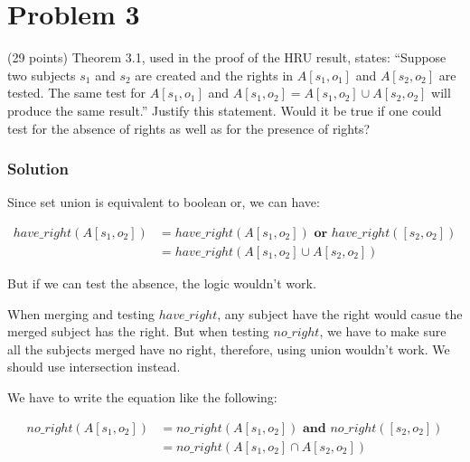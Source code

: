 \section*{Problem 3}

 (29 points) Theorem 3.1, used in the proof of the HRU result, states:
``Suppose two subjects $s_1$ and $s_2$ are created and the rights in $A[s_1, o_1]$ and $A[s_2, o_2]$ are tested.
The same test for $A[s_1, o_1]$ and $A[s_1, o_2] = A[s_1, o_2] \cup A[s_2, o_2]$ will produce the same result.''
Justify this statement.
Would it be true if one could test for the absence of rights as well as for the presence of rights?

\subsubsection*{Solution}

Since set union is equivalent to boolean or, we can have:

\begin{align*}
    have\_right(A[s_1, o_2]) & = have\_right(A[s_1, o_2]) \textbf{ or } have\_right([s_2, o_2]) \\
                             & = have\_right(A[s_1, o_2] \cup A[s_2, o_2])
\end{align*}

But if we can test the absence, the logic wouldn't work.

When merging and testing $have\_right$, any subject have the right would casue the merged subject has the right.
But when testing $no\_right$, we have to make sure all the subjects merged have no right, therefore, using union wouldn't work.
We should use intersection instead.

We have to write the equation like the following:

\begin{align*}
    no\_right(A[s_1, o_2]) & = no\_right(A[s_1, o_2])  \textbf{ and }  no\_right([s_2, o_2]) \\
                           & = no\_right(A[s_1, o_2] \cap A[s_2, o_2])
\end{align*}
